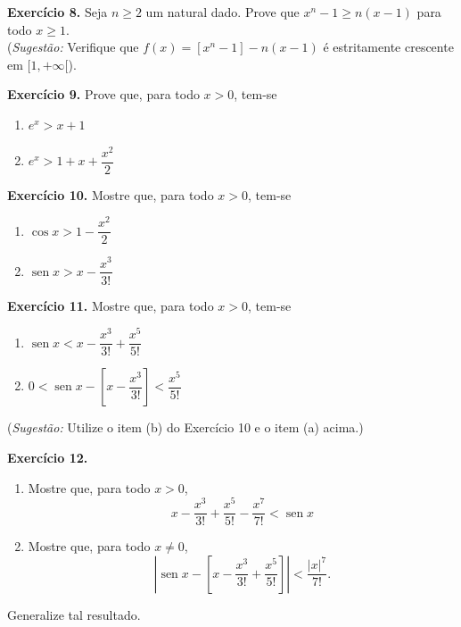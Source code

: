 \documentclass[12pt,a4paper]{article}
\begin{document}
\vspace{0.5cm}
\noindent\textbf{Exercício 8.} Seja $n \ge 2$ um natural dado. Prove que $x^n - 1 \ge n(x - 1)$ para todo $x \ge 1$.\\
(\textit{Sugestão:} Verifique que $f(x) = [x^n - 1] - n(x - 1)$ é estritamente crescente em $[1, +\infty[$).

\vspace{0.5cm}
\noindent\textbf{Exercício 9.} Prove que, para todo $x > 0$, tem-se
\begin{enumerate}
    \renewcommand{\theenumi}{\alph{enumi}}
    \renewcommand{\labelenumi}{\theenumi)}
    \item $e^x > x + 1$
    \item $e^x > 1 + x + \dfrac{x^2}{2}$
\end{enumerate}

\vspace{0.5cm}
\noindent\textbf{Exercício 10.} Mostre que, para todo $x > 0$, tem-se
\begin{enumerate}
    \renewcommand{\theenumi}{\alph{enumi}}
    \renewcommand{\labelenumi}{\theenumi)}
    \item $\cos x > 1 - \dfrac{x^2}{2}$
    \item $\operatorname{sen} x > x - \dfrac{x^3}{3!}$
\end{enumerate}

\vspace{0.5cm}
\noindent\textbf{Exercício 11.} Mostre que, para todo $x > 0$, tem-se
\begin{enumerate}
    \renewcommand{\theenumi}{\alph{enumi}}
    \renewcommand{\labelenumi}{\theenumi)}
    \item $\operatorname{sen} x < x - \dfrac{x^3}{3!} + \dfrac{x^5}{5!}$
    \item $0 < \operatorname{sen} x - \left[ x - \dfrac{x^3}{3!} \right] < \dfrac{x^5}{5!}$
\end{enumerate}
(\textit{Sugestão:} Utilize o item (b) do Exercício 10 e o item (a) acima.)

\vspace{0.5cm}
\noindent\textbf{Exercício 12.}
\begin{enumerate}
    \renewcommand{\theenumi}{\alph{enumi}}
    \renewcommand{\labelenumi}{\theenumi)}
    \item Mostre que, para todo $x > 0$,
    \[
    x - \dfrac{x^3}{3!} + \dfrac{x^5}{5!} - \dfrac{x^7}{7!} < \operatorname{sen} x
    \]
    \item Mostre que, para todo $x \neq 0$,
    \[
    \left| \operatorname{sen} x - \left[ x - \dfrac{x^3}{3!} + \dfrac{x^5}{5!} \right] \right| < \dfrac{|x|^7}{7!}.
    \]
\end{enumerate}
Generalize tal resultado.
\end{document}
